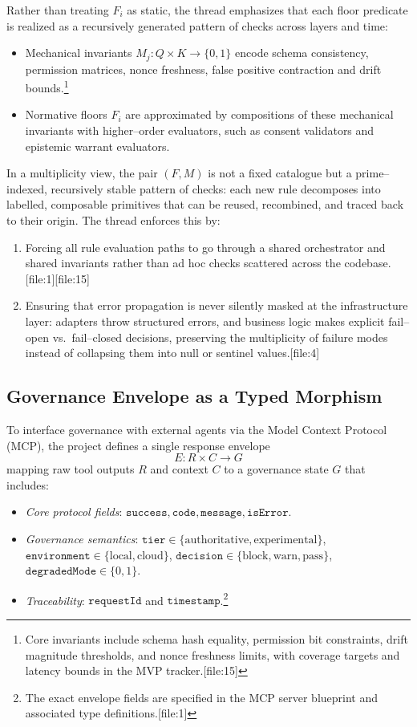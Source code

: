 \documentclass[11pt]{article}
\begin{document}
Rather than treating \(F_i\) as static, the thread emphasizes that each floor predicate is realized as a recursively generated pattern of checks across layers and time:
\begin{itemize}[leftmargin=*]
  \item Mechanical invariants \(M_j\colon Q \times K \to \{0,1\}\) encode schema consistency, permission matrices, nonce freshness, false positive contraction and drift bounds.\footnote{Core invariants include schema hash equality, permission bit constraints, drift magnitude thresholds, and nonce freshness limits, with coverage targets and latency bounds in the MVP tracker.[file:15]} 
  \item Normative floors \(F_i\) are approximated by compositions of these mechanical invariants with higher--order evaluators, such as consent validators and epistemic warrant evaluators.
\end{itemize}

In a multiplicity view, the pair \((F, M)\) is not a fixed catalogue but a prime--indexed, recursively stable pattern of checks: each new rule decomposes into labelled, composable primitives that can be reused, recombined, and traced back to their origin. The thread enforces this by:
\begin{enumerate}[leftmargin=*]
  \item Forcing all rule evaluation paths to go through a shared orchestrator and shared invariants rather than ad hoc checks scattered across the codebase.[file:1][file:15]
  \item Ensuring that error propagation is never silently masked at the infrastructure layer: adapters throw structured errors, and business logic makes explicit fail--open vs.\ fail--closed decisions, preserving the multiplicity of failure modes instead of collapsing them into null or sentinel values.[file:4]
\end{enumerate}

\subsection{Governance Envelope as a Typed Morphism}

To interface governance with external agents via the Model Context Protocol (MCP), the project defines a single response envelope
\[
  E: R \times C \to G
\]
mapping raw tool outputs \(R\) and context \(C\) to a governance state \(G\) that includes:
\begin{itemize}[leftmargin=*]
  \item \emph{Core protocol fields}: \(\texttt{success}, \texttt{code}, \texttt{message}, \texttt{isError}\).
  \item \emph{Governance semantics}: \(\texttt{tier} \in \{\text{authoritative},\text{experimental}\}\), \(\texttt{environment} \in \{\text{local},\text{cloud}\}\), \(\texttt{decision} \in \{\text{block},\text{warn},\text{pass}\}\), \(\texttt{degradedMode} \in \{0,1\}\).
  \item \emph{Traceability}: \(\texttt{requestId}\) and \(\texttt{timestamp}\).\footnote{The exact envelope fields are specified in the MCP server blueprint and associated type definitions.[file:1]} 
\end{itemize}
\end{document}
